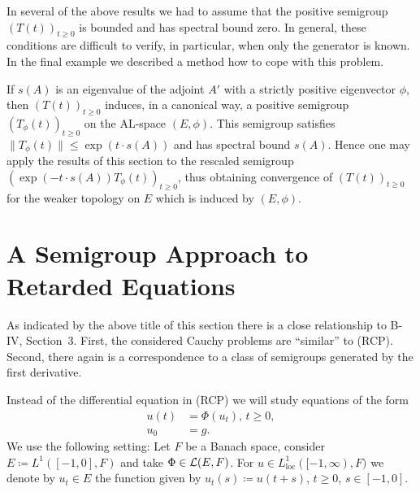 In several of the above results we had to assume that the positive semigroup $(T(t))_{t\geq 0}$ is bounded and has spectral bound zero.
In general, these conditions are difficult to verify, in particular, when only the generator is known.
In the final example we described a method how to cope with this problem. 

If $s(A)$ is an eigenvalue of the adjoint $A'$ with a strictly positive eigenvector $\phi$, then $(T(t))_{t\geq 0}$ induces, in a canonical way, a positive semigroup $(T_{\phi}(t))_{t \geq 0}$ on the AL-space $(E,\phi)$.
This semigroup satisfies $\|T_{\phi}(t)\| \leq \exp(t \cdot s(A))$ and has spectral bound $s(A)$.
Hence one may apply the results of this section to the rescaled semigroup $(\exp(-t \cdot s(A))T_{\phi}(t))_{t \geq 0}$, thus obtaining convergence of $(T(t))_{t \geq 0}$ for the weaker topology on $E$ which is induced by $(E,\phi)$.

\newpage
\section{A Semigroup Approach to Retarded Equations}\label{c4-3}
%
%
%
\hspace{1cm}{\Large by Annette Grabosch und Ulrich Moustakas}
\vspace{.5cm}
\newline
As indicated by the above title of this section there is a close relationship to B-IV, Section~3.
First, the considered Cauchy problems are \enquote{similar} to (RCP).
Second, there again is a correspondence to a class of semigroups generated by the first derivative.

Instead of the differential equation in (RCP) we will study equations of the form
\begin{equation*}\label{eq:c4-re} \tag{RE}
\begin{split} 
u(t) &= \Phi(u_t), \, t \geq 0,\\
u_0 &= g.
\end{split}
\end{equation*}
We use the following setting: Let $F$ be a Banach space, consider $E \coloneqq L^{1}([-1,0],F)$ and take $\Phi \in \mathcal{L}(E,F)$.
For $u \in L^{1}_{\mathrm{loc}}([-1,\infty),F)$ we denote by $u_t \in E$ the function given by $u_t(s) \coloneqq u(t+s)$, $t \geq 0$, $s \in [-1,0]$.

